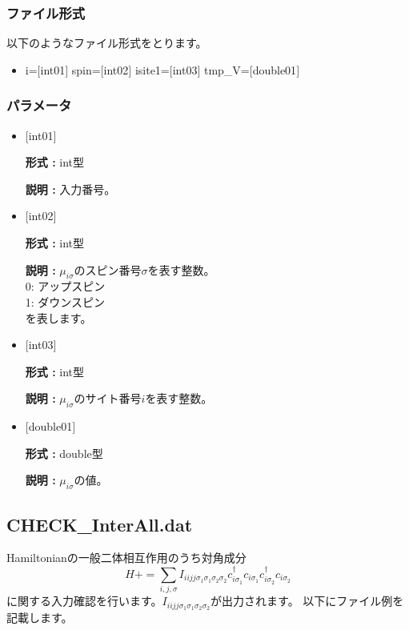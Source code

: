 \subsubsection{ファイル形式}
以下のようなファイル形式をとります。
 \begin{itemize}
   \item  i=$[$int01$]$ spin=$[$int02$]$ isite1=$[$int03$]$ tmp\_V=$[$double01$]$ 
 \end{itemize}
  
\subsubsection{パラメータ}
 \begin{itemize}

   \item  $[$int01$]$ 
   
    {\bf 形式 :} int型

   {\bf 説明 :} 入力番号。
   
   \item  $[$int02$]$ 
   
    {\bf 形式 :} int型

   {\bf 説明 :} $\mu_{i\sigma}$のスピン番号$\sigma$を表す整数。\\
0: アップスピン\\
1: ダウンスピン\\
を表します。
   
   \item  $[$int03$]$ 
   
    {\bf 形式 :} int型

    {\bf 説明 :}  $\mu_{i\sigma}$のサイト番号$i$を表す整数。
 
   \item  $[$double01$]$ 
   
    {\bf 形式 :} double型

   {\bf 説明 :} $\mu_{i\sigma}$の値。
     
\end{itemize}

\subsection{CHECK\_InterAll.dat}
Hamiltonianの一般二体相互作用のうち対角成分
\begin{equation}
H+=\sum_{i,j, \sigma} I_{iijj\sigma_1\sigma_1\sigma_2\sigma_2} c_{i\sigma_1}^{\dagger}c_{i\sigma_1}c_{i\sigma_2}^{\dagger}c_{i\sigma_2}
\end{equation}
に関する入力確認を行います。$ I_{iijj\sigma_1\sigma_1\sigma_2\sigma_2}$が出力されます。
以下にファイル例を記載します。

